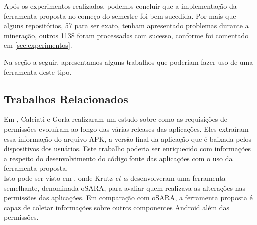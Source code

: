 \documentclass[a4paper,12pt]{article}
\begin{document}
Após os experimentos realizados, podemos concluir que a implementação da ferramenta proposta no começo do semestre foi bem sucedida. Por mais que alguns repositórios, 57 para ser exato, tenham apresentado problemas durante a mineração, outros 1138 foram processados com sucesso, conforme foi comentado em \ref{sec:experimentos}.

Na seção a seguir, apresentamos alguns trabalhos que poderiam fazer uso de uma ferramenta deste tipo.


\subsection{Trabalhos Relacionados}%
Em \cite{Calciati}, Calciati e Gorla realizaram um estudo sobre como as requisições de permissões evoluíram ao longo das várias releases das aplicações. Eles extraíram essa informação do arquivo APK, a versão final da aplicação que é baixada pelos dispositivos dos usuários. Este trabalho poderia ser enriquecido com informações a respeito do desenvolvimento do código fonte das aplicações com o uso da ferramenta proposta. \\

Isto pode ser visto em \cite{WhoAdded}, onde Krutz \textit{et al} desenvolveram uma ferramenta semelhante, denominada oSARA, para avaliar quem realizava as alterações nas permissões das aplicações. Em comparação com oSARA, a ferramenta proposta é capaz de coletar informações sobre outros componentes Android além das permissões.\\






\newpage
%


\nocite{developer}
\end{document}
